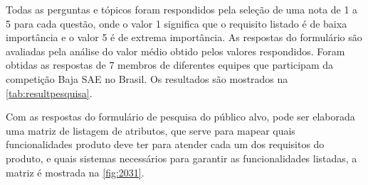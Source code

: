 Todas as perguntas e tópicos foram respondidos pela seleção de uma nota de 1 a 5 para cada questão, onde o valor 1 significa que o requisito listado é de baixa importância e
o valor 5 é de extrema importância.
As respostas do formulário são avaliadas pela análise do valor médio obtido pelos valores respondidos.
Foram obtidas as respostas de 7 membros de diferentes equipes que participam da competição Baja SAE no Brasil.
Os resultados são mostrados na \autoref{tab:resultpesquisa}.

\begin{table}[H]
    \caption{Resultado pesquisa de mercado}
    \label{tab:resultpesquisa}
    \centering
\end{table}

Com as respostas do formulário de pesquisa do público alvo, pode ser elaborada uma matriz de listagem de atributos, que serve para mapear quais funcionalidades produto deve ter para atender cada um dos requisitos
do produto, e quais sistemas necessários para garantir as funcionalidades listadas, a matriz é mostrada na \autoref{fig:2031}.

